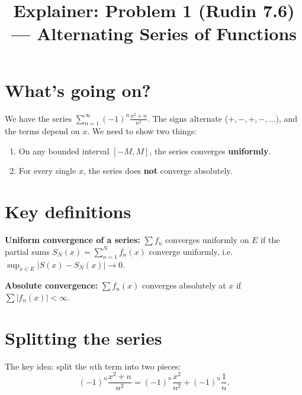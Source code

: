 \documentclass[12pt]{article}
\title{Explainer: Problem 1 (Rudin 7.6) --- Alternating Series of Functions}
\author{}
\date{}
\begin{document}
\maketitle

\section*{What's going on?}
We have the series $\sum_{n=1}^{\infty} (-1)^n \frac{x^2 + n}{n^2}$. The signs alternate ($+, -, +, -, \ldots$), and the terms depend on $x$. We need to show two things:
\begin{enumerate}
    \item On any bounded interval $[-M, M]$, the series converges \textbf{uniformly}.
    \item For every single $x$, the series does \textbf{not} converge absolutely.
\end{enumerate}

\section*{Key definitions}

\textbf{Uniform convergence of a series:} $\sum f_n$ converges uniformly on $E$ if the partial sums $S_N(x) = \sum_{n=1}^N f_n(x)$ converge uniformly, i.e.\ $\sup_{x \in E} |S(x) - S_N(x)| \to 0$.

\textbf{Absolute convergence:} $\sum f_n(x)$ converges absolutely at $x$ if $\sum |f_n(x)| < \infty$.

\section*{Splitting the series}

The key idea: split the $n$th term into two pieces:
$$
(-1)^n \frac{x^2 + n}{n^2} = (-1)^n \frac{x^2}{n^2} + (-1)^n \frac{1}{n}.
$$

\begin{center}
\end{center}
\end{document}
